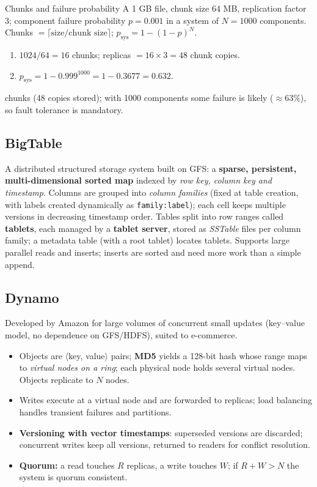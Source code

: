 \begin{solved}{Chunks and failure probability}
\Given A 1 GB file, chunk size 64 MB, replication factor 3; component failure probability $p = 0.001$ in a system of $N = 1000$ components.
\Formula Chunks $= \lceil \text{size}/\text{chunk size} \rceil$; $p_{\text{sys}} = 1 - (1-p)^N$.
\Steps
\begin{enumerate}[leftmargin=*]
  \item $1024/64 = 16$ chunks; replicas $= 16 \times 3 = 48$ chunk copies.
  \item $p_{\text{sys}} = 1 - 0.999^{1000} = 1 - 0.3677 = 0.632$.
\end{enumerate}
 chunks (48 copies stored); with 1000 components some failure is likely ($\approx 63\%$), so fault tolerance is mandatory.
\end{solved}

\subsection{BigTable}
A distributed structured storage system built on GFS: a \textbf{sparse, persistent, multi-dimensional sorted map} indexed by
\emph{row key, column key and timestamp}. Columns are grouped into \emph{column families} (fixed at table creation, with labels
created dynamically as \texttt{family:label}); each cell keeps multiple versions in decreasing timestamp order. Tables split into
row ranges called \textbf{tablets}, each managed by a \textbf{tablet server}, stored as \emph{SSTable} files per column family; a
metadata table (with a root tablet) locates tablets. Supports large parallel reads and inserts; inserts are sorted and need more
work than a simple append.

\subsection{Dynamo}
Developed by Amazon for large volumes of concurrent small updates (key--value model, no dependence on GFS/HDFS), suited to
e-commerce.
\begin{itemize}[leftmargin=*]
  \item Objects are $\langle$key, value$\rangle$ pairs; \textbf{MD5} yields a 128-bit hash whose range maps to \emph{virtual nodes
        on a ring}; each physical node holds several virtual nodes. Objects replicate to $N$ nodes.
  \item Writes execute at a virtual node and are forwarded to replicas; load balancing handles transient failures and partitions.
  \item \textbf{Versioning with vector timestamps}: superseded versions are discarded; concurrent writes keep all versions, returned
        to readers for conflict resolution.
  \item \textbf{Quorum:} a read touches $R$ replicas, a write touches $W$; if $R + W > N$ the system is quorum consistent.
\end{itemize}

